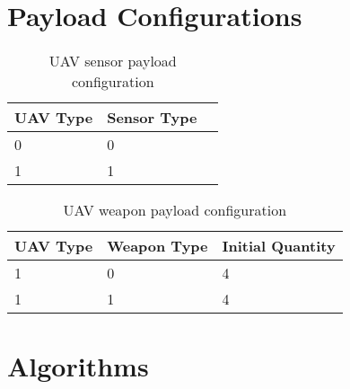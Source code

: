 


\chapter{Payload Configurations}
\label{sec:pyldConfigs}
\begin{table}[H]
	\caption{UAV sensor payload configuration}
	\centering
	\label{tab:uavSensorMap}
	\begin{tabular}{|p{1cm}|p{1cm}|p{1cm}|}
		\hline
		UAV Type & Sensor Type\\ \hline
		0 & 0 \\
		1 & 1 \\
		\hline
	\end{tabular}
\end{table}

\begin{table}[H]
	\caption{UAV weapon payload configuration}
	\centering
	\label{tab:uavWpnMap}
	\begin{tabular}{|p{1cm}|p{1.5cm}|p{2cm}|}
		\hline
		UAV Type & Weapon Type & Initial Quantity\\ \hline
		1 & 0 & 4 \\
		1 & 1 & 4 \\
		\hline
	\end{tabular}
\end{table}


\chapter{Algorithms}
\label{sec:algorithms}

